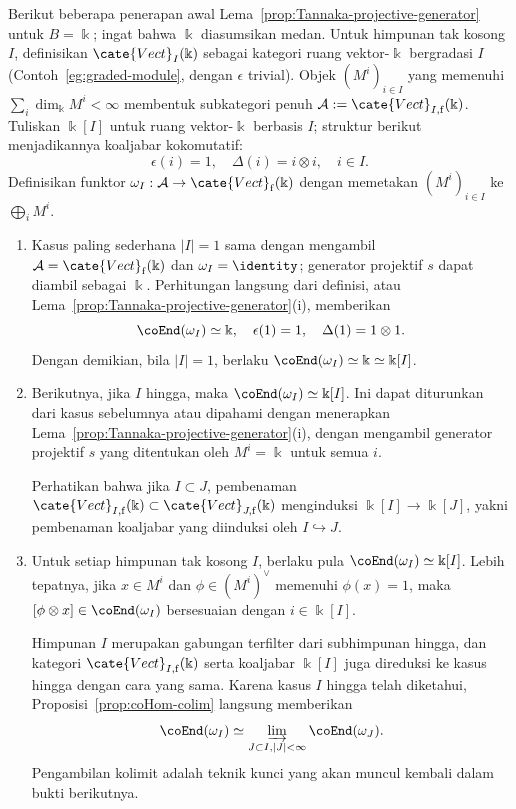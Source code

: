 \begin{example}\label{eg:Tannakian-I-graded-0}
	Berikut beberapa penerapan awal
	Lema~\ref{prop:Tannaka-projective-generator} untuk $B=\Bbbk$; ingat
	bahwa $\Bbbk$ diasumsikan medan. Untuk himpunan tak kosong $I$, definisikan
	$\cate{Vect}_I(\Bbbk)$ sebagai kategori ruang vektor-$\Bbbk$ bergradasi
	$I$ (Contoh~\ref{eg:graded-module}, dengan $\epsilon$ trivial). Objek
	$(M^i)_{i\in I}$ yang memenuhi
	$\sum_i\dim_{\Bbbk}M^i<\infty$ membentuk subkategori penuh
	$\mathcal{A}:=\cate{Vect}_{I,\mathrm f}(\Bbbk)$. Tuliskan $\Bbbk[I]$
	untuk ruang vektor-$\Bbbk$ berbasis $I$; struktur berikut menjadikannya
	koaljabar kokomutatif:
	\[ \epsilon(i) = 1, \quad \Delta(i) = i \otimes i, \quad i \in I. \]
	Definisikan funktor
	$\omega_I:\mathcal{A}\to\cate{Vect}_{\mathrm f}(\Bbbk)$ dengan
	memetakan $(M^i)_{i\in I}$ ke $\bigoplus_iM^i$.
	\begin{enumerate}
		\item Kasus paling sederhana $|I|=1$ sama dengan mengambil
		$\mathcal{A}=\cate{Vect}_{\mathrm f}(\Bbbk)$ dan
		$\omega_I=\identity$; generator projektif $s$ dapat diambil sebagai
		$\Bbbk$. Perhitungan langsung dari definisi, atau
		Lema~\ref{prop:Tannaka-projective-generator}(i), memberikan
		\[ \coEnd(\omega_I) \simeq \Bbbk, \quad \epsilon(1) = 1, \quad \Delta(1) = 1 \otimes 1. \]
		Dengan demikian, bila $|I|=1$, berlaku
		$\coEnd(\omega_I)\simeq\Bbbk\simeq\Bbbk[I]$.

		\item Berikutnya, jika $I$ hingga, maka
		$\coEnd(\omega_I)\simeq\Bbbk[I]$. Ini dapat diturunkan dari kasus
		sebelumnya atau dipahami dengan menerapkan
		Lema~\ref{prop:Tannaka-projective-generator}(i), dengan mengambil
		generator projektif $s$ yang ditentukan oleh $M^i=\Bbbk$ untuk semua
		$i$.

		Perhatikan bahwa jika $I\subset J$, pembenaman
		$\cate{Vect}_{I,\mathrm f}(\Bbbk)\subset
		\cate{Vect}_{J,\mathrm f}(\Bbbk)$ menginduksi
		$\Bbbk[I]\to\Bbbk[J]$, yakni pembenaman koaljabar yang diinduksi oleh
		$I\hookrightarrow J$.

		\item Untuk setiap himpunan tak kosong $I$, berlaku pula
		$\coEnd(\omega_I)\simeq\Bbbk[I]$. Lebih tepatnya, jika
		$x\in M^i$ dan $\phi\in(M^i)^\vee$ memenuhi $\phi(x)=1$, maka
		$[\phi\otimes x]\in\coEnd(\omega_I)$ bersesuaian dengan
		$i\in\Bbbk[I]$.

		Himpunan $I$ merupakan gabungan terfilter dari subhimpunan hingga,
		dan kategori $\cate{Vect}_{I,\mathrm f}(\Bbbk)$ serta koaljabar
		$\Bbbk[I]$ juga direduksi ke kasus hingga dengan cara yang sama.
		Karena kasus $I$ hingga telah diketahui,
		Proposisi~\ref{prop:coHom-colim} langsung memberikan
		\[ \coEnd(\omega_I) \simeq \varinjlim_{J \subset I, |J| < \infty} \coEnd(\omega_J). \]
		Pengambilan kolimit adalah teknik kunci yang akan muncul kembali dalam
		bukti berikutnya.
	\end{enumerate}
\end{example}

